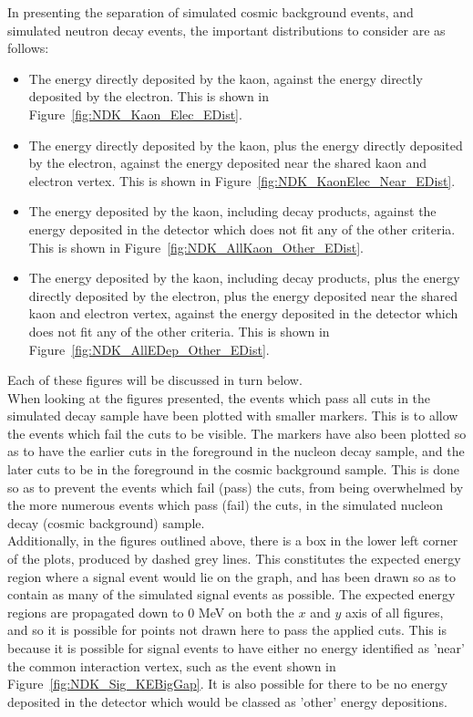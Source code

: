 In presenting the separation of simulated cosmic background events, and simulated neutron decay events, the important distributions to consider are as follows:
\begin{itemize}
\item The energy directly deposited by the kaon, against the energy directly deposited by the electron. This is shown in Figure~\ref{fig:NDK_Kaon_Elec_EDist}.
\item The energy directly deposited by the kaon, plus the energy directly deposited by the electron, against the energy deposited near the shared kaon and electron vertex. This is shown in Figure~\ref{fig:NDK_KaonElec_Near_EDist}.
\item The energy deposited by the kaon, including decay products, against the energy deposited in the detector which does not fit any of the other criteria. This is shown in Figure~\ref{fig:NDK_AllKaon_Other_EDist}.
\item The energy deposited by the kaon, including decay products, plus the energy directly deposited by the electron, plus the energy deposited near the shared kaon and electron vertex, against the energy deposited in the detector which does not fit any of the other criteria. This is shown in Figure~\ref{fig:NDK_AllEDep_Other_EDist}.
\end{itemize}
Each of these figures will be discussed in turn below. \\

When looking at the figures presented, the events which pass all cuts in the simulated decay sample have been plotted with smaller markers. This is to allow the events which fail the cuts to be visible. The markers have also been plotted so as to have the earlier cuts in the foreground in the nucleon decay sample, and the later cuts to be in the foreground in the cosmic background sample. This is done so as to prevent the events which fail (pass) the cuts, from being overwhelmed by the more numerous events which pass (fail) the cuts, in the simulated nucleon decay (cosmic background) sample. \\

Additionally, in the figures outlined above, there is a box in the lower left corner of the plots, produced by dashed grey lines. This constitutes the expected energy region where a signal event would lie on the graph, and has been drawn so as to contain as many of the simulated signal events as possible. The expected energy regions are propagated down to 0 MeV on both the $x$ and $y$ axis of all figures, and so it is possible for points not drawn here to pass the applied cuts. This is because it is possible for signal events to have either no energy identified as 'near' the common interaction vertex, such as the event shown in Figure~\ref{fig:NDK_Sig_KEBigGap}. It is also possible for there to be no energy deposited in the detector which would be classed as 'other' energy depositions. \\

